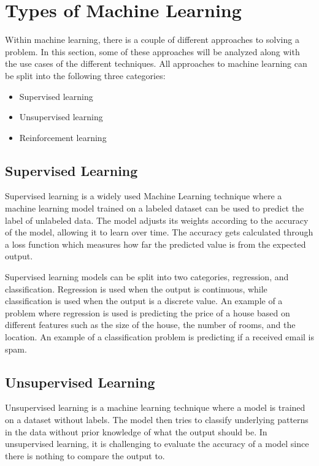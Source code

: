\chapter{Types of Machine Learning}\label{ch:ml-types}
Within machine learning, there is a couple of different approaches to solving a problem. In this section, some of these
approaches will be analyzed along with the use cases of the different techniques. All approaches to machine learning can
be split into the following three categories:
\begin{itemize}
    \item Supervised learning
    \item Unsupervised learning
    \item Reinforcement learning
\end{itemize}


\section{Supervised Learning}\label{ch:supervised-learning}
Supervised learning is a widely used Machine Learning technique where a machine learning model trained 
on a labeled dataset can be used to predict the label of unlabeled data. The model adjusts its weights 
according to the accuracy of the model, allowing it to learn over time. The accuracy gets calculated through
a loss function which measures how far the predicted value is from the expected output.\cite{ml_supervised_learning}

Supervised learning models can be split into two categories, regression, and classification. Regression is used when
the output is continuous, while classification is used when the output is a discrete value. An example of a problem
where regression is used is predicting the price of a house based on different features such as the size of the house,
the number of rooms, and the location. An example of a classification problem is predicting if a received email is spam. \cite{ml_reg_vs_class}


\section{Unsupervised Learning}\label{ch:unsupervised-learning}
Unsupervised learning is a machine learning technique where a model is trained on a dataset without labels. The model then
tries to classify underlying patterns in the data without prior knowledge of what the output should be. In unsupervised learning,
it is challenging to evaluate the accuracy of a model since there is nothing to compare the output to. \cite{ml_unsupervised_learning}

